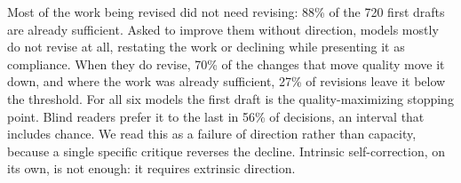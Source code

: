 Most of the work being revised did not need revising: 88\% of the 720 first drafts are
already sufficient. Asked to improve them without direction, models mostly do not revise
at all, restating the work or declining while presenting it as compliance. When they do
revise, 70\% of the changes that move quality move it down, and where the work was already
sufficient, 27\% of revisions leave it below the threshold. For all six models the first
draft is the quality-maximizing stopping point. Blind readers prefer it to the last in
56\% of decisions, an interval that includes chance. We read this as a failure of
direction rather than capacity, because a single specific critique reverses the decline.
Intrinsic self-correction, on its own, is not enough: it requires extrinsic direction.
